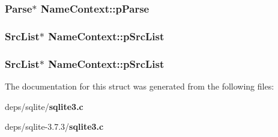 \subsubsection{\setlength{\rightskip}{0pt plus 5cm}\bf{Parse}$\ast$ \bf{Name\-Context::p\-Parse}}\label{structNameContext_b71f02c658556f84c466f62d344a7ae8}


\subsubsection{\setlength{\rightskip}{0pt plus 5cm}\bf{Src\-List}$\ast$ \bf{Name\-Context::p\-Src\-List}}\label{structNameContext_267680ef572bb6a679c5f24fda64eb07}


\subsubsection{\setlength{\rightskip}{0pt plus 5cm}\bf{Src\-List}$\ast$ \bf{Name\-Context::p\-Src\-List}}\label{structNameContext_267680ef572bb6a679c5f24fda64eb07}




The documentation for this struct was generated from the following files:\begin{CompactItemize}
\item 
deps/sqlite/\bf{sqlite3.c}\item 
deps/sqlite-3.7.3/\bf{sqlite3.c}\end{CompactItemize}
